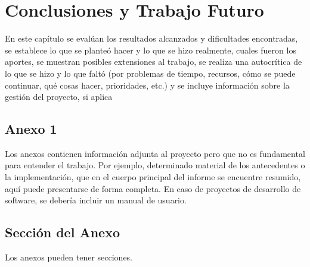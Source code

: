 \documentclass{liccomp}
\begin{document}

\chapter{Conclusiones y Trabajo Futuro}

En este capítulo se evalúan los resultados alcanzados y
dificultades encontradas, se establece lo que se planteó hacer y lo que se hizo
realmente, cuales fueron los aportes, se muestran posibles extensiones al trabajo, se
realiza una autocrítica de lo que se hizo y lo que faltó (por problemas de tiempo,
recursos, cómo se puede continuar, qué cosas hacer, prioridades, etc.) y se incluye
información sobre la gestión del proyecto, si aplica


{ %

\backmatter %


\newpage



} %



\begin{appendix}

\chapter{Anexo 1}

Los anexos contienen información adjunta al proyecto pero que no es fundamental
para entender el trabajo. Por ejemplo, determinado material de los antecedentes o la
implementación, que en el cuerpo principal del informe se encuentre resumido, aquí
puede presentarse de forma completa. En caso de proyectos de desarrollo de
software, se debería incluir un manual de usuario.

\section{Sección del Anexo}

Los anexos pueden tener secciones.

\end{appendix}


\end{document}
